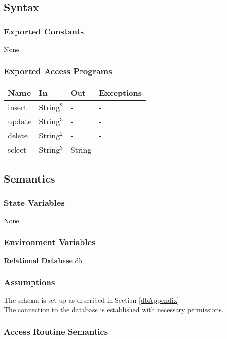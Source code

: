 \documentclass[12pt, titlepage]{article}
\begin{document}
\subsection{Syntax}

\subsubsection{Exported Constants}
None

\subsubsection{Exported Access Programs}

\begin{center}
\begin{tabular}{p{4cm} p{4cm} p{4cm} p{3cm}}
\hline
\textbf{Name} & \textbf{In} & \textbf{Out} & \textbf{Exceptions} \\
\hline
insert & String$^2$ & - & - \\
update & String$^3$ & - & - \\
delete & String$^2$ & - & - \\
select & String$^3$ & String & - \\
\hline
\end{tabular}
\end{center}

\subsection{Semantics}

\subsubsection{State Variables}
None

\subsubsection{Environment Variables}
\textbf{Relational Database} db

\subsubsection{Assumptions}
The schema is set up as described in Section \ref{dbAppendix}\\
The connection to the database is established with necessary permissions.

\subsubsection{Access Routine Semantics}
\end{document}
